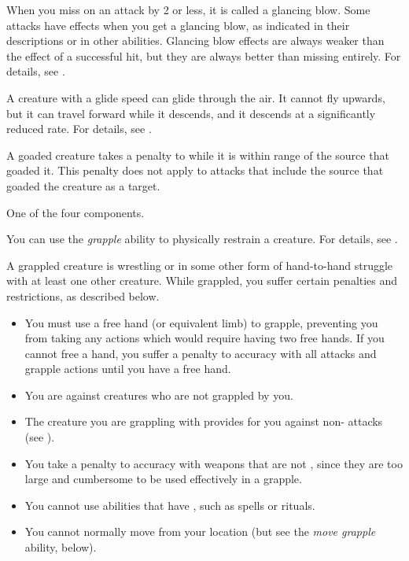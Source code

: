  When you miss on an attack by 2 or less, it is called a glancing blow.
Some attacks have effects when you get a glancing blow, as indicated in their descriptions or in other abilities.
Glancing blow effects are always weaker than the effect of a successful hit, but they are always better than missing entirely.
For details, see .

 A creature with a glide speed can glide through the air.
It cannot fly upwards, but it can travel forward while it descends, and it descends at a significantly reduced rate.
For details, see .

 A goaded creature takes a  penalty to  while it is within \rngshort range of the source that goaded it.
This penalty does not apply to attacks that include the source that goaded the creature as a target.

 One of the four  components.

 You can use the \textit{grapple} ability to physically restrain a creature.
For details, see .

 A grappled creature is wrestling or in some other form of hand-to-hand struggle with at least one other creature.
While grappled, you suffer certain penalties and restrictions, as described below.
\begin{itemize}
    \item You must use a free hand (or equivalent limb) to grapple, preventing you from taking any actions which would require having two free hands.
        If you cannot free a hand, you suffer a  penalty to accuracy with all  attacks and grapple actions until you have a free hand.
    \item You are  against creatures who are not grappled by you.
    \item The creature you are grappling with provides  for you against non- attacks (see ).
    \item You take a  penalty to accuracy with weapons that are not , since they are too large and cumbersome to be used effectively in a grapple.
    \item You cannot use abilities that have , such as spells or rituals.
    \item You cannot normally move from your location (but see the \textit{move grapple} ability, below).
\end{itemize}

